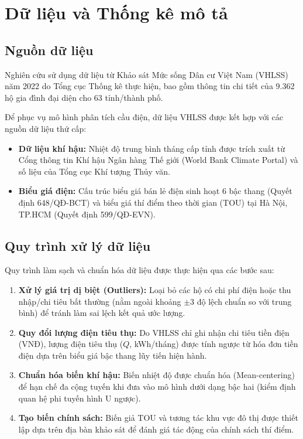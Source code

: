\documentclass[12pt,a4paper,oneside]{article}
\begin{document}
	\section{Dữ liệu và Thống kê mô tả}
	\subsection{Nguồn dữ liệu}
	Nghiên cứu sử dụng dữ liệu từ Khảo sát Mức sống Dân cư Việt Nam (VHLSS) năm 2022 do Tổng cục Thống kê thực hiện, bao gồm thông tin chi tiết của 9.362 hộ gia đình đại diện cho 63 tỉnh/thành phố.
	
	Để phục vụ mô hình phân tích cầu điện, dữ liệu VHLSS được kết hợp với các nguồn dữ liệu thứ cấp:
	\begin{itemize}
		\item \textbf{Dữ liệu khí hậu:} Nhiệt độ trung bình tháng cấp tỉnh được trích xuất từ Cổng thông tin Khí hậu Ngân hàng Thế giới (World Bank Climate Portal) và số liệu của Tổng cục Khí tượng Thủy văn.
		\item \textbf{Biểu giá điện:} Cấu trúc biểu giá bán lẻ điện sinh hoạt 6 bậc thang (Quyết định 648/QĐ-BCT) và biểu giá thí điểm theo thời gian (TOU) tại Hà Nội, TP.HCM (Quyết định 599/QĐ-EVN).
	\end{itemize}
	
	\subsection{Quy trình xử lý dữ liệu}
	Quy trình làm sạch và chuẩn hóa dữ liệu được thực hiện qua các bước sau:
	\begin{enumerate}
		\item \textbf{Xử lý giá trị dị biệt (Outliers):} Loại bỏ các hộ có chi phí điện hoặc thu nhập/chi tiêu bất thường (nằm ngoài khoảng $\pm 3$ độ lệch chuẩn so với trung bình) để tránh làm sai lệch kết quả ước lượng.
		\item \textbf{Quy đổi lượng điện tiêu thụ:} Do VHLSS chỉ ghi nhận chi tiêu tiền điện (VNĐ), lượng điện tiêu thụ ($Q$, kWh/tháng) được tính ngược từ hóa đơn tiền điện dựa trên biểu giá bậc thang lũy tiến hiện hành.
		\item \textbf{Chuẩn hóa biến khí hậu:} Biến nhiệt độ được chuẩn hóa (Mean-centering) để hạn chế đa cộng tuyến khi đưa vào mô hình dưới dạng bậc hai (kiểm định quan hệ phi tuyến hình U ngược).
		\item \textbf{Tạo biến chính sách:} Biến giả TOU và tương tác khu vực đô thị được thiết lập dựa trên địa bàn khảo sát để đánh giá tác động của chính sách thí điểm.
	\end{enumerate}
	
\end{document}
